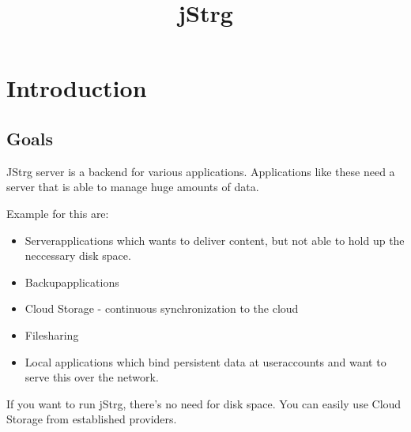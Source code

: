 \documentclass
[   oneside,         %
    12pt,            %
    DIV15,           %
    headsepline,     %
    footsepline,     %
    openright,       %
    a4paper,         %
    abstracton,      %
    titlepage,       %
    headinclude,     %
]   {scrreprt}       %
\author{\namedesautors}
\begin{document}
\renewcommand*{\chapterheadstartvskip}{\vspace*{-\topskip}} %

\onehalfspacing %


\cleardoublepage %
\pagestyle{scrheadings} %
\tableofcontents

\cleardoublepage %
	
	\title{jStrg}
	\maketitle	
	\newpage{}
	
	
	\part{Introduction}
	\chapter{Goals}
	
	JStrg server is a backend for various applications.
    Applications like these need a server that is able to manage huge amounts of data.

    Example for this are:
	\begin{itemize}
		\item Serverapplications which wants to deliver content,
                but not able to hold up the neccessary disk space.
		\item Backupapplications
		\item Cloud Storage - continuous synchronization to the cloud
		\item Filesharing
		\item Local applications which bind persistent data at useraccounts and want to serve
		this over the network.
	\end{itemize}
	
	If you want to run jStrg, there's no need for disk space.
    You can easily use Cloud Storage from established providers.
	
\end{document}

